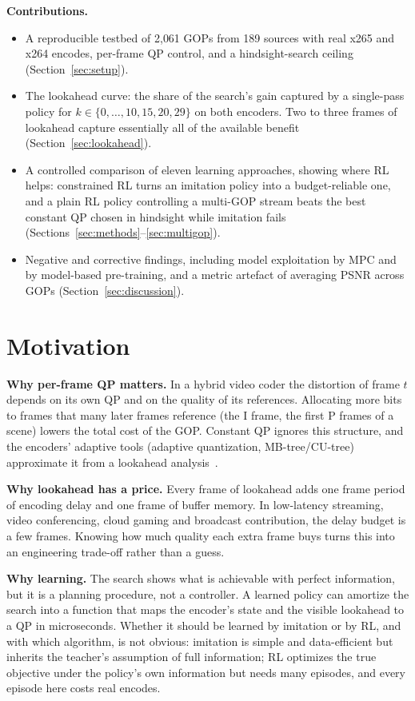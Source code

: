 \documentclass[conference]{IEEEtran}
\begin{document}
\textbf{Contributions.}
\begin{itemize}
\item A reproducible testbed of 2{,}061 GOPs from 189 sources with real x265 and x264 encodes, per-frame QP control, and a hindsight-search ceiling (Section~\ref{sec:setup}).
\item The lookahead curve: the share of the search's gain captured by a single-pass policy for $k \in \{0,\dots,10,15,20,29\}$ on both encoders. Two to three frames of lookahead capture essentially all of the available benefit (Section~\ref{sec:lookahead}).
\item A controlled comparison of eleven learning approaches, showing where RL helps: constrained RL turns an imitation policy into a budget-reliable one, and a plain RL policy controlling a multi-GOP stream beats the best constant QP chosen in hindsight while imitation fails (Sections~\ref{sec:methods}--\ref{sec:multigop}).
\item Negative and corrective findings, including model exploitation by MPC and by model-based pre-training, and a metric artefact of averaging PSNR across GOPs (Section~\ref{sec:discussion}).
\end{itemize}

\section{Motivation}
\textbf{Why per-frame QP matters.} In a hybrid video coder the distortion of frame $t$ depends on its own QP and on the quality of its references. Allocating more bits to frames that many later frames reference (the I frame, the first P frames of a scene) lowers the total cost of the GOP. Constant QP ignores this structure, and the encoders' adaptive tools (adaptive quantization, MB-tree/CU-tree) approximate it from a lookahead analysis~\cite{garrett2009mbtree}.

\textbf{Why lookahead has a price.} Every frame of lookahead adds one frame period of encoding delay and one frame of buffer memory. In low-latency streaming, video conferencing, cloud gaming and broadcast contribution, the delay budget is a few frames. Knowing how much quality each extra frame buys turns this into an engineering trade-off rather than a guess.

\textbf{Why learning.} The search shows what is achievable with perfect information, but it is a planning procedure, not a controller. A learned policy can amortize the search into a function that maps the encoder's state and the visible lookahead to a QP in microseconds. Whether it should be learned by imitation or by RL, and with which algorithm, is not obvious: imitation is simple and data-efficient but inherits the teacher's assumption of full information; RL optimizes the true objective under the policy's own information but needs many episodes, and every episode here costs real encodes.
\end{document}

